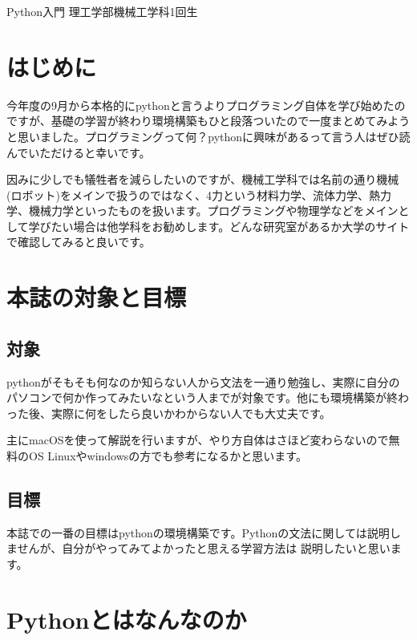 \documentclass[10pt,b5paper,papersize,dvipdfmx]{jsbook}
\begin{document}


\kaishititle%
  {Python入門}%
  {理工学部機械工学科1回生}%
  {}%

%
\section*{はじめに}
今年度の9月から本格的にpythonと言うよりプログラミング自体を学び始めたのですが、基礎の学習が終わり環境構築もひと段落ついたので一度まとめてみようと思いました。プログラミングって何？pythonに興味があるって言う人はぜひ読んでいただけると幸いです。\par
因みに少しでも犠牲者を減らしたいのですが、機械工学科では名前の通り機械(ロボット)をメインで扱うのではなく、4力という材料力学、流体力学、熱力学、機械力学といったものを扱います。プログラミングや物理学などをメインとして学びたい場合は他学科をお勧めします。どんな研究室があるか大学のサイトで確認してみると良いです。\par
%
\clearpage

\section{本誌の対象と目標}
\subsection{対象}
pythonがそもそも何なのか知らない人から文法を一通り勉強し、実際に自分のパソコンで何か作ってみたいなという人までが対象です。他にも環境構築が終わった後、実際に何をしたら良いかわからない人でも大丈夫です。\par
主にmacOSを使って解説を行いますが、やり方自体はさほど変わらないので無料のOS Linuxやwindowsの方でも参考になるかと思います。\par
\subsection{目標}
本誌での一番の目標はpythonの環境構築です。Pythonの文法に関しては説明しませんが、自分がやってみてよかったと思える学習方法は
説明したいと思います。\par
\section{Pythonとはなんなのか}
\end{document}
